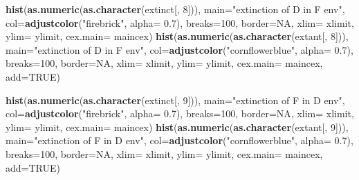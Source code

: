 \documentclass[]{book}
\newenvironment{Shaded}{\begin{snugshade}}{\end{snugshade}}
\newcommand{\KeywordTok}[1]{\textcolor[rgb]{0.13,0.29,0.53}{\textbf{{#1}}}}
\newcommand{\DataTypeTok}[1]{\textcolor[rgb]{0.13,0.29,0.53}{{#1}}}
\newcommand{\DecValTok}[1]{\textcolor[rgb]{0.00,0.00,0.81}{{#1}}}
\newcommand{\FloatTok}[1]{\textcolor[rgb]{0.00,0.00,0.81}{{#1}}}
\newcommand{\StringTok}[1]{\textcolor[rgb]{0.31,0.60,0.02}{{#1}}}
\newcommand{\OtherTok}[1]{\textcolor[rgb]{0.56,0.35,0.01}{{#1}}}
\newcommand{\NormalTok}[1]{{#1}}
\theoremstyle{definition}
\theoremstyle{definition}
\theoremstyle{definition}
\theoremstyle{remark}
\begin{document}
\begin{Shaded}
\begin{Highlighting}[]
\KeywordTok{hist}\NormalTok{(}\KeywordTok{as.numeric}\NormalTok{(}\KeywordTok{as.character}\NormalTok{(extinct[, }\DecValTok{8}\NormalTok{])), }\DataTypeTok{main=}\StringTok{"extinction of D in F env"}\NormalTok{, }\DataTypeTok{col=}\KeywordTok{adjustcolor}\NormalTok{(}\StringTok{"firebrick"}\NormalTok{, }\DataTypeTok{alpha=} \FloatTok{0.7}\NormalTok{), }\DataTypeTok{breaks=}\DecValTok{100}\NormalTok{, }\DataTypeTok{border=}\OtherTok{NA}\NormalTok{, }\DataTypeTok{xlim=}\NormalTok{ xlimit, }\DataTypeTok{ylim=}\NormalTok{ ylimit, }\DataTypeTok{cex.main=}\NormalTok{ maincex)}
\KeywordTok{hist}\NormalTok{(}\KeywordTok{as.numeric}\NormalTok{(}\KeywordTok{as.character}\NormalTok{(extant[, }\DecValTok{8}\NormalTok{])), }\DataTypeTok{main=}\StringTok{"extinction of D in F env"}\NormalTok{, }\DataTypeTok{col=}\KeywordTok{adjustcolor}\NormalTok{(}\StringTok{"cornflowerblue"}\NormalTok{, }\DataTypeTok{alpha=} \FloatTok{0.7}\NormalTok{), }\DataTypeTok{breaks=}\DecValTok{100}\NormalTok{, }\DataTypeTok{border=}\OtherTok{NA}\NormalTok{, }\DataTypeTok{xlim=}\NormalTok{ xlimit, }\DataTypeTok{ylim=}\NormalTok{ ylimit, }\DataTypeTok{cex.main=}\NormalTok{ maincex, }\DataTypeTok{add=}\OtherTok{TRUE}\NormalTok{)}

\KeywordTok{hist}\NormalTok{(}\KeywordTok{as.numeric}\NormalTok{(}\KeywordTok{as.character}\NormalTok{(extinct[, }\DecValTok{9}\NormalTok{])), }\DataTypeTok{main=}\StringTok{"extinction of F in D env"}\NormalTok{, }\DataTypeTok{col=}\KeywordTok{adjustcolor}\NormalTok{(}\StringTok{"firebrick"}\NormalTok{, }\DataTypeTok{alpha=} \FloatTok{0.7}\NormalTok{), }\DataTypeTok{breaks=}\DecValTok{100}\NormalTok{, }\DataTypeTok{border=}\OtherTok{NA}\NormalTok{, }\DataTypeTok{xlim=}\NormalTok{ xlimit, }\DataTypeTok{ylim=}\NormalTok{ ylimit, }\DataTypeTok{cex.main=}\NormalTok{ maincex)}
\KeywordTok{hist}\NormalTok{(}\KeywordTok{as.numeric}\NormalTok{(}\KeywordTok{as.character}\NormalTok{(extant[, }\DecValTok{9}\NormalTok{])), }\DataTypeTok{main=}\StringTok{"extinction of F in D env"}\NormalTok{, }\DataTypeTok{col=}\KeywordTok{adjustcolor}\NormalTok{(}\StringTok{"cornflowerblue"}\NormalTok{, }\DataTypeTok{alpha=} \FloatTok{0.7}\NormalTok{), }\DataTypeTok{breaks=}\DecValTok{100}\NormalTok{, }\DataTypeTok{border=}\OtherTok{NA}\NormalTok{, }\DataTypeTok{xlim=}\NormalTok{ xlimit, }\DataTypeTok{ylim=}\NormalTok{ ylimit, }\DataTypeTok{cex.main=}\NormalTok{ maincex, }\DataTypeTok{add=}\OtherTok{TRUE}\NormalTok{)}


\end{Highlighting}
\end{Shaded}
\end{document}
